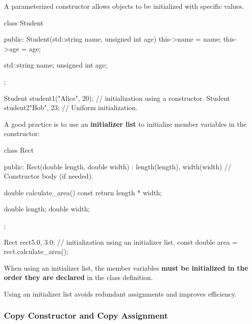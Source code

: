 \vspace{-0.3em}

A parameterized constructor allows objects to be initialized with specific values.

\vspace{-0.3em}

\begin{codeblock}[language=C++]
class Student {
public:
    Student(std::string name, unsigned int age) {
        this->name = name;
        this->age = age;
    }

    std::string name;
    unsigned int age;
};

Student student1("Alice", 20); // initialization using a constructor.
Student student2{"Bob", 23}; // Uniform initialization.
\end{codeblock}

\vspace{-0.3em}

A good practice is to use an \textbf{initializer list} to initialize member variables in the constructor:

\vspace{-0.3em}

\begin{codeblock}[language=C++]
class Rect {
public:
    Rect(double length, double width) : length(length), width(width) {
        // Constructor body (if needed).
    }

    double calculate_area() const {
        return length * width;
    }

    double length;
    double width;
};

Rect rect{5.0, 3.0}; // initialization using an initializer list.
const double area = rect.calculate_area();
\end{codeblock}

When using an initializer list, the member variables \textbf{must be initialized in the order they are declared} in the class definition.

\vspace{-0.3em}

\begin{tipsblock}
Using an initializer list avoids redundant assignments and improves efficiency.
\end{tipsblock}

\vspace{-1em}

\subsubsection{Copy Constructor and Copy Assignment}

